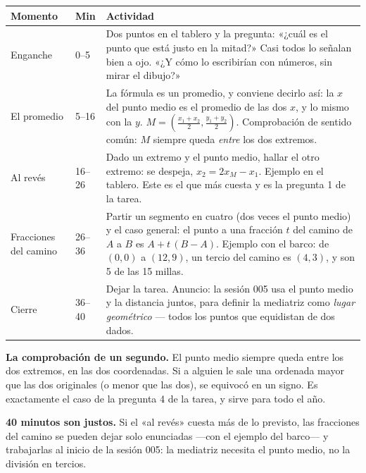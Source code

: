 \documentclass[11pt]{article}
\begin{document}
\begin{center}
{\renewcommand{\arraystretch}{1.3}
\begin{tabularx}{\linewidth}{@{}l l X@{}}
  \toprule
  \textbf{Momento} & \textbf{Min} & \textbf{Actividad}\\
  \midrule
  Enganche & 0--5 & Dos puntos en el tablero y la pregunta: «¿cuál es el punto que está
    justo en la mitad?» Casi todos lo señalan bien a ojo. «¿Y cómo lo escribirían con
    números, sin mirar el dibujo?»\\
  El promedio & 5--16 & La fórmula es un promedio, y conviene decirlo así: la $x$ del punto
    medio es el promedio de las dos $x$, y lo mismo con la $y$. $M = \left(\frac{x_1+x_2}{2},
    \frac{y_1+y_2}{2}\right)$. Comprobación de sentido común: $M$ siempre queda
    \emph{entre} los dos extremos.\\
  Al revés & 16--26 & Dado un extremo y el punto medio, hallar el otro extremo: se despeja,
    $x_2 = 2x_M - x_1$. Ejemplo en el tablero. Este es el que más cuesta y es la pregunta 1
    de la tarea.\\
  Fracciones del camino & 26--36 & Partir un segmento en cuatro (dos veces el punto medio)
    y el caso general: el punto a una fracción $t$ del camino de $A$ a $B$ es
    $A + t\,(B - A)$. Ejemplo con el barco: de $(0,0)$ a $(12,9)$, un tercio del camino es
    $(4, 3)$, y son 5 de las 15 millas.\\
  Cierre & 36--40 & Dejar la tarea. Anuncio: la sesión 005 usa el punto medio y la distancia
    juntos, para definir la mediatriz como \emph{lugar geométrico} — todos los puntos que
    equidistan de dos dados.\\
  \bottomrule
\end{tabularx}}
\end{center}

\begin{nota}
\textbf{La comprobación de un segundo.} El punto medio siempre queda entre los dos extremos,
en las dos coordenadas. Si a alguien le sale una ordenada mayor que las dos originales (o menor
que las dos), se equivocó en un signo. Es exactamente el caso de la pregunta 4 de la tarea, y
sirve para todo el año.
\end{nota}

\begin{nota}
\textbf{40 minutos son justos.} Si el «al revés» cuesta más de lo previsto, las fracciones del
camino se pueden dejar solo enunciadas —con el ejemplo del barco— y trabajarlas al inicio de la
sesión 005: la mediatriz necesita el punto medio, no la división en tercios.
\end{nota}
\end{document}
